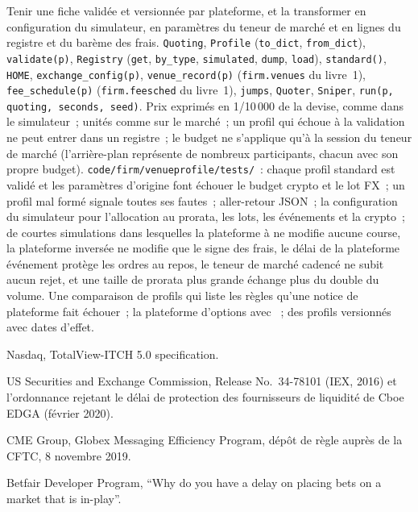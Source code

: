 \begin{build}
 Tenir une fiche validée et versionnée par plateforme, et la transformer en configuration du simulateur, en paramètres du teneur de marché et en
lignes du registre et du barème des frais.
 \texttt{Quoting}, \texttt{Profile} (\texttt{to\_dict}, \texttt{from\_dict}), \texttt{validate(p)}, \texttt{Registry} (\texttt{get},
\texttt{by\_type}, \texttt{simulated}, \texttt{dump}, \texttt{load}), \texttt{standard()}, \texttt{HOME}, \texttt{exchange\_config(p)},
\texttt{venue\_record(p)} (\texttt{firm.venues} du livre~1), \texttt{fee\_schedule(p)} (\texttt{firm.feesched} du livre~1), \texttt{jumps},
\texttt{Quoter}, \texttt{Sniper}, \texttt{run(p, quoting, seconds, seed)}.
 Prix exprimés en 1/10\,000 de la devise, comme dans le simulateur~; unités comme sur le marché~; un profil qui échoue à la validation ne peut
entrer dans un registre~; le budget ne s'applique qu'à la session du teneur de marché (l'arrière-plan représente de nombreux participants, chacun avec son propre budget).
 \texttt{code/firm/venueprofile/tests/}~: chaque profil standard est validé et les paramètres d'origine font échouer le budget crypto
et le lot FX~; un profil mal formé signale toutes ses fautes~; aller-retour JSON~; la configuration du simulateur pour l'allocation au prorata, les lots, les événements et la crypto~; de courtes
simulations dans lesquelles la plateforme à  ne modifie aucune course, la plateforme inversée ne modifie que le signe des frais, le délai de la plateforme événement protège les ordres au repos, le
teneur de marché cadencé ne subit aucun rejet, et une taille de prorata plus grande échange plus du double du volume.
 Une comparaison de profils qui liste les règles qu'une notice de plateforme fait échouer~; la plateforme d'options avec ~; des profils versionnés avec
dates d'effet.
\end{build}

\begin{omsources}
\item Nasdaq, TotalView-ITCH 5.0 specification.
\item US Securities and Exchange Commission, Release No.\ 34-78101 (IEX, 2016) et l'ordonnance rejetant le
délai de protection des fournisseurs de liquidité de Cboe EDGA (février 2020).
\item CME Group, Globex Messaging Efficiency Program, dépôt de règle auprès de la CFTC, 8 novembre 2019.
\item Betfair Developer Program, ``Why do you have a delay on placing bets on a market that is in-play''.
\end{omsources}

